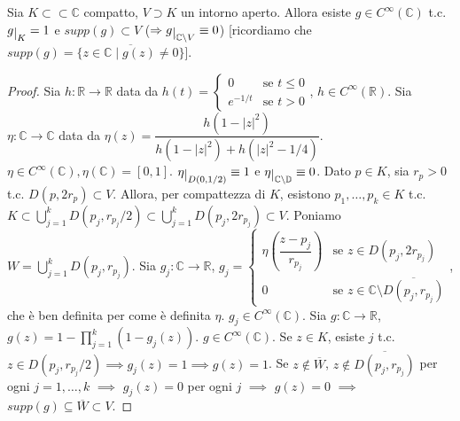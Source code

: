 \begin{lm}
  Sia $K \subset \subset \mathbb{C}$ compatto, $V \supset K$ un intorno aperto. Allora esiste $g \in C^{\infty}(\mathbb{C})$ t.c. $g\restrict{K}=1$ e $supp(g) \subset V$ ($\implies g\restrict{\mathbb{C}\setminus V}\equiv 0$) [ricordiamo che $supp(g)=\overline{\{z \in \mathbb{C} \mid g(z)\not=0\}}$].
\end{lm}

\begin{proof}
  Sia $h: \mathbb{R} \longrightarrow \mathbb{R}$ data da $h(t)=\begin{cases}
    0 & \mbox{se }t\le 0\\ e^{-1/t} & \mbox{se }t>0
\end{cases}$, $h \in C^{\infty}(\mathbb{R})$. Sia $\eta: \mathbb{C} \longrightarrow \mathbb{C}$ data da $\eta(z)=\dfrac{h(1-|z|^2)}{h(1-|z|^2)+h(|z|^2-1/4)}$. $\eta \in C^{\infty}(\mathbb{C}), \eta(\mathbb{C})=[0, 1]$.
$\eta\restrict{D(0, 1/2)}\equiv 1$ e $\eta\restrict{\mathbb{C}\setminus \mathbb{D}} \equiv 0$. Dato $p \in K$, sia $r_p>0$ t.c. $D(p, 2r_p) \subset V$.
Allora, per compattezza di $K$, esistono $p_1, \dots, p_k \in K$ t.c. $\displaystyle K \subset \bigcup_{j=1}^k D(p_j, r_{p_j}/2) \subset \bigcup_{j=1}^k D(p_j, 2r_{p_j}) \subset V$. Poniamo $\displaystyle W=\bigcup_{j=1}^k D(p_j, r_{p_j})$.
Sia $g_j:\mathbb{C} \longrightarrow \mathbb{R}$, $g_j=\begin{cases}
  \eta\left(\dfrac{z-p_j}{r_{p_j}}\right) & \mbox{se }z\in D(p_j, 2r_{p_j})\\ 0 & \mbox{se }z\in\mathbb{C} \setminus \overline{D(p_j, r_{p_j})}
\end{cases}$, che è ben definita per come è definita $\eta$. $g_j \in C^{\infty}(\mathbb{C})$. Sia $g: \mathbb{C} \longrightarrow \mathbb{R}$, $\displaystyle g(z)=1-\prod_{j=1}^k (1-g_j(z))$. $g \in C^{\infty}(\mathbb{C})$.
Se $z \in K$, esiste $j$ t.c. $z \in D(p_j, r_{p_j}/2) \implies g_j(z)=1 \implies g(z)=1$. Se $z \not\in \overline{W}$, $z \not\in\overline{D(p_j, r_{p_j})}$ per ogni $j=1, \dots, k$ $\implies$ $g_j(z)=0$ per ogni $j$ $\implies$ $g(z)=0$ $\implies$ $supp(g) \subseteq \overline{W} \subset V$.
\end{proof}
